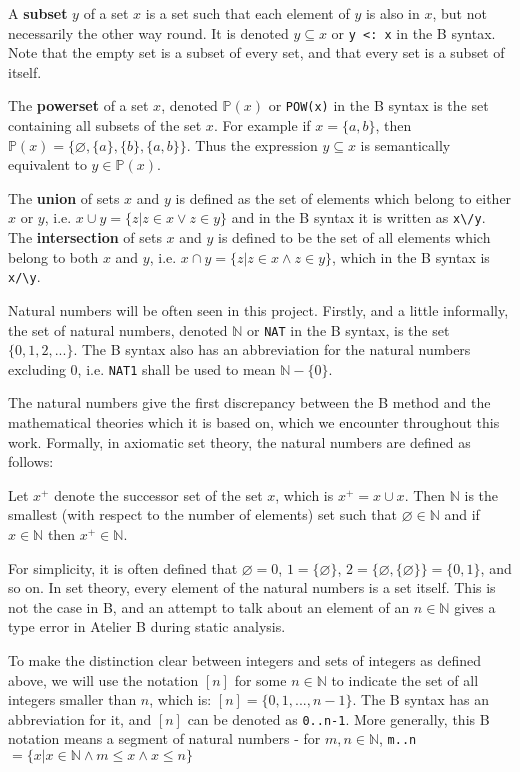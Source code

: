 \documentclass[11pt,journal]{IEEEtran}
\begin{document}
	A \textbf{subset} $y$ of a set $x$ is a set such that each element of $y$ is also in $x$, but not necessarily the other way round. It is denoted $y \subseteq x$ or \texttt{y <: x} in the B syntax. Note that the empty set is a subset of every set, and that every set is a subset of itself.
	
	The \textbf{powerset} of a set $x$, denoted $\mathbb{P}(x)$ or \texttt{POW(x)} in the B syntax is the set containing all subsets of the set $x$. For example if $x = \{a,b\}$, then $\mathbb{P}(x) = \{\varnothing, \{a\}, \{b\}, \{a,b\}\}$. Thus the expression $y \subseteq x$ is semantically equivalent to $y \in \mathbb{P}(x)$. 
	
	The \textbf{union} of sets $x$ and $y$ is defined as the set of elements which belong to either $x$ or $y$, i.e. $x \cup y = \{z| z \in x \vee z \in y\}$ and in the B syntax it is written as \verb|x\/y|. The \textbf{intersection} of sets $x$ and $y$ is defined to be the set of all elements which belong to both $x$ and $y$, i.e. $x \cap y = \{z | z \in x \wedge z \in y \}$, which in the B syntax is \verb|x/\y|.

	
	Natural numbers will be often seen in this project. Firstly, and a little informally, the set of natural numbers, denoted $\mathbb{N}$ or \texttt{NAT} in the B syntax, is the set $\{0,1,2, ...\}$. The B syntax also has an abbreviation for the natural numbers excluding 0, i.e. \texttt{NAT1} shall be used to mean $\mathbb{N}-\{0\}$.
	
	The natural numbers give the first discrepancy between the B method and the mathematical theories which it is based on, which we encounter throughout this work. Formally, in axiomatic set theory, the natural numbers are defined as follows:
	
	Let $x^+$ denote the successor set of the set $x$, which is $x^+ = x \cup {x}$. Then $\mathbb{N}$ is the smallest (with respect to the number of elements) set such that $\varnothing \in \mathbb{N}$ and if $x \in \mathbb{N}$ then $x^+ \in \mathbb{N}$.
	
	For simplicity, it is often defined that $\varnothing = 0$, $1 = \{\varnothing \}$, $2 = \{\varnothing , \{\varnothing\} \} = \{0,1\}$, and so on. In set theory, every element of the natural numbers is a set itself. This is not the case in B, and an attempt to talk about an element of an $n \in \mathbb{N}$ gives a type error in Atelier B during static analysis.
	
	To make the distinction clear between integers and sets of integers as defined above, we will use the notation $[n]$ for some $n \in \mathbb{N}$ to indicate the set of all integers smaller than $n$, which is: $[n] = \{0,1, ...,n-1\}$. The B syntax has an abbreviation for it, and $[n]$ can be denoted as \texttt{0..n-1}. More generally, this B notation means a segment of natural numbers - for $m, n \in \mathbb{N}$, \texttt{m..n} $= \{x | x \in \mathbb{N} \wedge m \leq x \wedge x \leq n\}$
	
\end{document}
